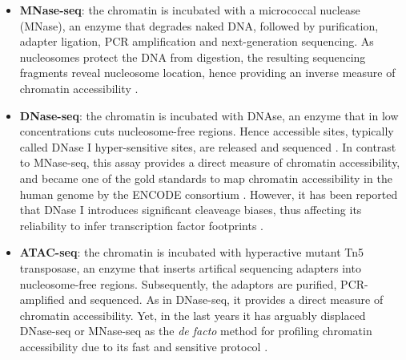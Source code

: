 \begin{itemize}

	\item \textbf{MNase-seq}: the chromatin is incubated with a micrococcal nuclease (MNase), an enzyme that degrades naked DNA, followed by purification, adapter ligation, PCR amplification and next-generation sequencing. As nucleosomes protect the DNA from digestion, the resulting sequencing fragments reveal nucleosome location, hence providing an inverse measure of chromatin accessibility \cite{Kaplan2008}.

	\item \textbf{DNase-seq}: the chromatin is incubated with DNAse, an enzyme that in low concentrations cuts nucleosome-free regions. Hence accessible sites, typically called DNase I hyper-sensitive sites, are released and sequenced \cite{Song2010}. In contrast to MNase-seq, this assay provides a direct measure of chromatin accessibility, and became one of the gold standards to map chromatin accessibility in the human genome by the ENCODE consortium \cite{ENCODE2012,Thurman2012}. However, it has been reported that DNase I introduces significant cleaveage biases, thus affecting its reliability to infer transcription factor footprints \cite{He2013}.

	\item \textbf{ATAC-seq}: the chromatin is incubated with hyperactive mutant Tn5 transposase, an enzyme that inserts artifical sequencing adapters into nucleosome-free regions. Subsequently, the adaptors are purified, PCR-amplified  and sequenced. As in DNase-seq, it provides a direct measure of chromatin accessibility. Yet, in the last years it has arguably displaced DNase-seq or MNase-seq as the \textit{de facto} method for profiling chromatin accessibility due to its fast and sensitive protocol \cite{Buenrostro2015b,Tsompana2014,Nordstrom2019}.


\end{itemize}
